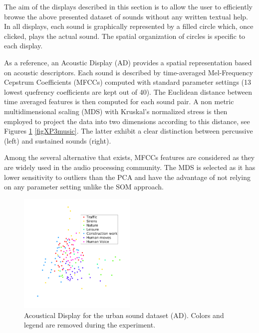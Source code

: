 \documentclass{aes2e}
\begin{document}
The aim of the displays described in this section is to allow the user to efficiently browse the above presented dataset of sounds without any written textual help. In all displays, each sound is graphically represented by a filled circle which, once clicked, plays the actual sound. The spatial organization of circles is specific to each display.

As a reference, an Acoustic Display (AD) provides a spatial representation based on acoustic descriptors. Each sound is described by time-averaged Mel-Frequency Cepstrum Coefficients (MFCCs) computed with standard parameter settings (13 lowest quefrency coefficients are kept out of 40). The Euclidean distance between time averaged features is then computed for each sound pair. A non metric multidimensional scaling (MDS) with Kruskal's normalized stress \cite{kruskal1964multidimensional} is then employed to project the data into two dimensions according to this distance, see Figures \ref{figXP3urban} \ref{figXP3music}. The latter exhibit a clear distinction between percussive (left) and sustained sounds (right).

Among the several alternative that exists, MFCCs features are considered as they are widely used in the audio processing community. The MDS is selected as it has lower sensitivity to outliers than the PCA and have the advantage of not relying on any parameter setting unlike the SOM approach. 


\begin{figure}[t]
\begin{center}
\includegraphics[width=0.5\textwidth]{gfx/urban_mds.png} 
\end{center}
\caption{\label{figXP3urban} Acoustical Display for the urban sound dataset (AD). Colors and legend are removed during the experiment.}
\end{figure}
\end{document}
